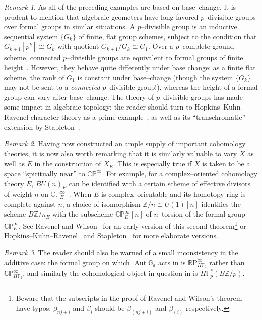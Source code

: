 \documentclass{amsart}
\newcommand{\Z}{\mathbb Z}
\newcommand{\F}{\mathbb F}
\newcommand{\G}{\mathbb G}
\newcommand{\R}{\mathbb R}
\newcommand{\RP}{\R\mathrm P}
\newcommand{\C}{\mathbb{C}}
\newcommand{\CP}{\C\P}
\renewcommand{\P}{\mathbb{P}}
\newcommand{\<}{\langle}
\renewcommand{\>}{\rangle}
\DeclareMathOperator{\Aut}{Aut}
\theoremstyle{plain}
\theoremstyle{definition}
\theoremstyle{remark}
\newtheorem*{remark}{Remark}
\begin{document}
\begin{remark}\label{RemarkpDivisibleGpsExist}
As all of the preceding examples are based on base--change, it is prudent to mention that algebraic geometers have long favored $p$--divisible groups over formal groups in similar situations.  A $p$--divisible group is an inductive sequential system $\{G_k\}$ of finite, flat group schemes, subject to the condition that $G_{k+1}[p^k] \cong G_k$ with quotient $G_{k+1} / G_k \cong G_1$.  Over a $p$--complete ground scheme, connected $p$--divisible groups are equivalent to formal groups of finite height~\cite[Proposition 1]{TatePDiv}.  However, they behave quite differently under base change: as a finite flat scheme, the rank of $G_1$ is constant under base--change (though the system $\{G_k\}$ may not be sent to a \emph{connected} $p$--divisible group!), whereas the height of a formal group can vary after base--change.  The theory of $p$--divisible groups has made some impact in algebraic topology; the reader should turn to Hopkins--Kuhn--Ravenel character theory as a prime example~\cite{HKR}, as well as its ``transchromatic'' extension by Stapleton~\cite{Stapleton}.
\end{remark}

\begin{remark}\label{ExamplesOfFSchFromAlgTop}
Having now constructed an ample supply of important cohomology theories, it is now also worth remarking that it is similarly valuable to vary $X$ as well as $E$ in the construction of $X_E$.  This is especially true if $X$ is taken to be a space ``spiritually near'' to $\CP^\infty$.  For example, for a complex--oriented cohomology theory $E$, $BU(n)_E$ can be identified with a certain scheme of effective divisors of weight $n$ on $\CP^\infty_E$~\cite[Section 8.3]{StricklandFSFG}.  When $E$ is complex--orientable and its homotopy ring is complete against $n$, a choice of isomorphism $\Z/n \cong U(1)[n]$ identifies the scheme $B\Z/n_E$ with the subscheme $\CP^\infty_E[n]$ of $n$--torsion of the formal group $\CP^\infty_E$.  See Ravenel and Wilson~\cite[Theorem 5.7]{RavenelWilson} for an early version of this second theorem\footnote{Beware that the subscripts in the proof of Ravenel and Wilson's theorem have typos: $\beta_{nj+i}$ and $\beta_i$ should be $\beta_{(nj+i)}$ and $\beta_{(i)}$ respectively.} or Hopkins--Kuhn--Ravenel~\cite[Section 5]{HKR} and Stapleton~\cite[Theorem 2.1 and Proposition 2.3]{Stapleton} for more elaborate versions.
\end{remark}

\begin{remark}
The reader should also be warned of a small inconsistency in the additive case: the formal group on which $\Aut \G_a$ acts in  is $\RP^\infty_{H\F_2}$ rather than $\CP^\infty_{H\F_2}$, and similarly the cohomological object in question in  is $H\F_p^*(B\Z/p)$.
\end{remark}
\end{document}
